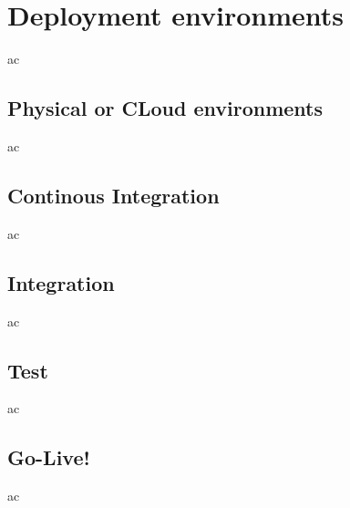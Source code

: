 \chapter{Deployment environments}

ac

\section{Physical or CLoud environments}

ac

\section{Continous Integration}

ac

\section{Integration}

ac

\section{Test}

ac

\section{Go-Live!}

ac